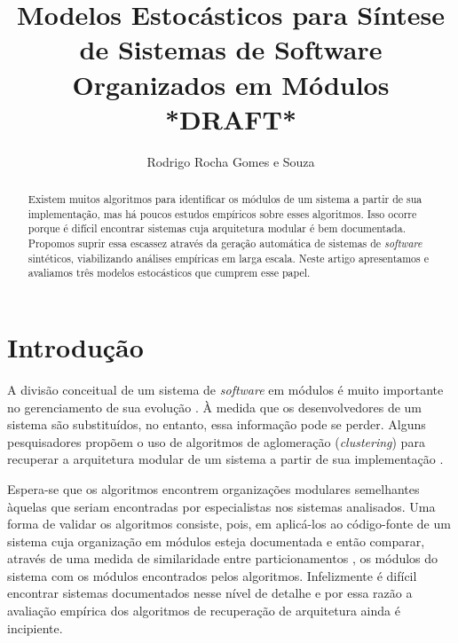 \documentclass{acm_proc_article-sp}
\begin{document}
\title{Modelos Estocásticos para Síntese de Sistemas de Software Organizados em Módulos \\ *DRAFT*}
\author{Rodrigo Rocha Gomes e Souza}
\maketitle

\begin{abstract}

Existem muitos algoritmos para identificar os módulos de um sistema a partir de sua implementação, mas há poucos estudos empíricos sobre esses algoritmos. Isso ocorre porque é difícil encontrar sistemas cuja arquitetura modular é bem documentada. Propomos suprir essa escassez através da geração automática de sistemas de \emph{software} sintéticos, viabilizando análises empíricas em larga escala. Neste artigo apresentamos e avaliamos três modelos estocásticos que cumprem esse papel.

\end{abstract}

\section{Introdução} %

A divisão conceitual de um sistema de \emph{software} em módulos
é muito importante no gerenciamento de sua evolução \cite{Parnas1972}. À medida que os desenvolvedores de um sistema são substituídos, no entanto, essa informação pode se perder. Alguns pesquisadores propõem o uso de algoritmos de aglomeração (\emph{clustering}) para recuperar a arquitetura modular de um sistema a partir de sua implementação \cite{Mancoridis1998,Andritsos2003,Maqbool2007}. %

Espera-se que os algoritmos encontrem organizações modulares semelhantes àquelas que seriam encontradas por  especialistas nos sistemas analisados. Uma forma de validar os algoritmos consiste, pois, em aplicá-los ao código-fonte de um sistema cuja organização em módulos esteja documentada e então comparar, através de uma medida de similaridade entre particionamentos \cite{Tzerpos1999,Wen2004a}, os módulos do sistema com os módulos encontrados pelos algoritmos. Infelizmente é difícil encontrar sistemas documentados nesse nível de detalhe e por essa razão a avaliação empírica dos algoritmos de recuperação de arquitetura ainda é incipiente. %
\end{document}
